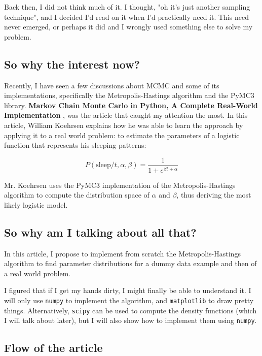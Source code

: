 Back then, I did not think much of it. I thought, "oh it's just another sampling technique", and I decided I'd read on it when I'd practically need it. This need never emerged, or perhaps it did and I wrongly used something else to solve my problem.

\subsection{So why the interest now?}
Recently, I have seen a few discussions about MCMC and some of its implementations, specifically the Metropolis-Hastings algorithm and the PyMC3 library. \textbf{Markov Chain Monte Carlo in Python, A Complete Real-World Implementation} \cite{KoehrsenMCMCPython2018}, was the article that caught my attention the most. In this article, William Koehrsen explains how he was able to learn the approach by applying it to a real world problem: to estimate the parameters of a logistic function that represents his sleeping patterns:

\begin{equation}P(\text {sleep} / t, \alpha, \beta)=\frac{1}{1+e^{\beta t+\alpha}}\end{equation}

Mr. Koehrsen uses the PyMC3 implementation of the Metropolis-Hastings algorithm to compute the distribution space of $\alpha$ and $\beta$, thus deriving the most likely logistic model.

\subsection{So why am I talking about all that?}

In this article, I propose to implement from scratch the Metropolis-Hastings algorithm to find parameter distributions for a dummy data example and then of a real world problem.

I figured that if I get my hands dirty, I might finally be able to understand it. I will only use \lstinline{numpy} to implement the algorithm, and \lstinline{matplotlib} to draw pretty things. Alternatively, \lstinline{scipy} can be used to compute the density functions (which I will talk about later), but I will also show how to implement them using \lstinline{numpy}.

\subsection{Flow of the article}

